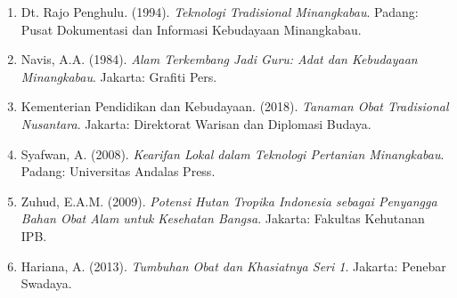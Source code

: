 \documentclass[a4paper,12pt]{article}
\begin{document}
\begin{enumerate}
\item Dt. Rajo Penghulu. (1994). \textit{Teknologi Tradisional Minangkabau}. Padang: Pusat Dokumentasi dan Informasi Kebudayaan Minangkabau.
\item Navis, A.A. (1984). \textit{Alam Terkembang Jadi Guru: Adat dan Kebudayaan Minangkabau}. Jakarta: Grafiti Pers.
\item Kementerian Pendidikan dan Kebudayaan. (2018). \textit{Tanaman Obat Tradisional Nusantara}. Jakarta: Direktorat Warisan dan Diplomasi Budaya.
\item Syafwan, A. (2008). \textit{Kearifan Lokal dalam Teknologi Pertanian Minangkabau}. Padang: Universitas Andalas Press.
\item Zuhud, E.A.M. (2009). \textit{Potensi Hutan Tropika Indonesia sebagai Penyangga Bahan Obat Alam untuk Kesehatan Bangsa}. Jakarta: Fakultas Kehutanan IPB.
\item Hariana, A. (2013). \textit{Tumbuhan Obat dan Khasiatnya Seri 1}. Jakarta: Penebar Swadaya.
\end{enumerate}
\end{document}
